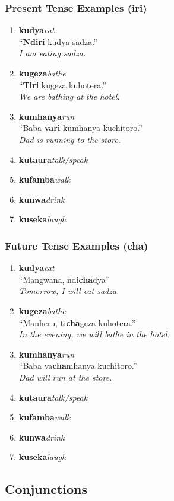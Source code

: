 \documentclass[12pt]{article}
\newcommand{\dw}[2]{\textbf{#1}\hspace{1em}\textit{#2}\\}
\newcommand{\tl}[2]{``#1''\\\textit{#2}}
\begin{document}
\subsubsection{Present Tense Examples (iri)}
\begin{enumerate}
\item \dw{kudya}{eat} \tl{\textbf{Ndiri} kudya sadza.}{I am eating sadza.}
\item \dw{kugeza}{bathe} \tl{\textbf{Tiri} kugeza kuhotera.}{We are bathing at the hotel.}
\item \dw{kumhanya}{run} \tl{Baba \textbf{vari} kumhanya kuchitoro.}{Dad is running to the store.}
\item \dw{kutaura}{talk/speak}
\item \dw{kufamba}{walk}
\item \dw{kunwa}{drink}
\item \dw{kuseka}{laugh}
\end{enumerate}

\subsubsection{Future Tense Examples (cha)}
\begin{enumerate}
\item \dw{kudya}{eat} \tl{Mangwana, ndi\textbf{cha}dya}{Tomorrow, I will eat sadza.}
\item \dw{kugeza}{bathe} \tl{Manheru, ti\textbf{cha}geza kuhotera.}{In the evening, we will bathe in the hotel.}
\item \dw{kumhanya}{run} \tl{Baba va\textbf{cha}mhanya kuchitoro.}{Dad will run at the store.}
\item \dw{kutaura}{talk/speak}
\item \dw{kufamba}{walk}
\item \dw{kunwa}{drink}
\item \dw{kuseka}{laugh}
\end{enumerate}

\subsection{Conjunctions}
\end{document}
